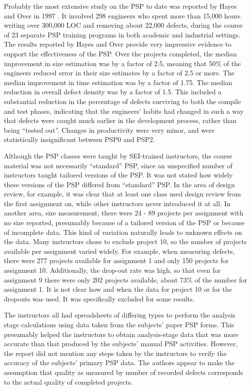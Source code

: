 Probably the most extensive study on the PSP to date was reported by Hayes
and Over in 1997 \cite{CMU97}.  It involved 298 engineers who spent more
than 15,000 hours writing over 300,000 LOC and removing about 22,000
defects, during the course of 23 separate PSP training programs in both
academic and industrial settings.  The results reported by Hayes and Over
provide very impressive evidence to support the effectiveness of the PSP.
Over the projects completed, the median improvement in size estimation was
by a factor of 2.5, meaning that 50\% of the engineers reduced error in
their size estimates by a factor of 2.5 or more.  The median improvement in
time estimation was by a factor of 1.75.  The median reduction in overall
defect density was by a factor of 1.5.  This included a substantial
reduction in the percentage of defects surviving to both the compile and
test phases, indicating that the engineers' habits had changed in such a
way that defects were caught much earlier in the development process,
rather than being ``tested out''.  Changes in productivity were very minor,
and were statistically insignificant between PSP0 and PSP2.

Although the PSP classes were taught by SEI-trained instructors, the course
material was not necessarily ``standard'' PSP, since an unspecified number
of instructors taught tailored versions of the PSP. It was not stated how
widely these versions of the PSP differed from ``standard'' PSP. In the
area of design review, for example, it was clear that at least one class
used design review from the first assignment on, while other instructors
never introduced it at all.  In another area, size measurement, there were
24 - 89 projects per assignment with no size reported, presumably because
of a tailored version of the PSP or because of incomplete data.  This kind
of variation naturally leads to unknown effects on the data. Many
instructors chose to exclude project 10, so the number of projects
available per assignment varied widely.  For example, when measuring
defects, there were 277 projects available for assignment 1 and only 150
projects for assignment 10.  Additionally, the drop-out rate was high, so
that even for assignment 9 there were only 202 projects available, about
73\% of the number for assignment 1.  It is not clear how and when the data
for project 10 or for the dropouts was used. It was specifically excluded
for some results.

The instructors all had spreadsheets of differing types to perform the
analysis stage calculations using data taken from the subjects' paper PSP
forms.  This presumably helped the instructors to obtain analysis-stage
data that was more accurate than that produced by the subjects' manual PSP
activities.  However, the report did not mention any steps taken by the
instructors to verify the accuracy of the subjects' primary PSP data. The
authors appear to make the assumption that quality as measured by number of
recorded defects corresponds to the actual quality of completed projects.


